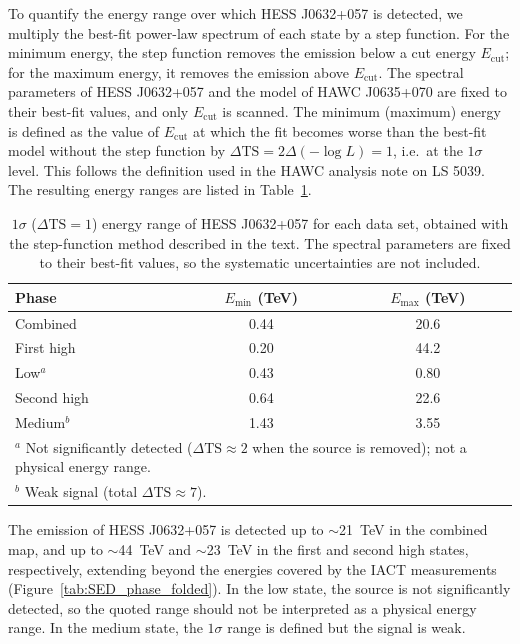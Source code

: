 \documentclass[10pt,letter]{article}
\begin{document}
To quantify the energy range over which HESS J0632+057 is detected, we multiply the best-fit power-law spectrum of each state by a step function. For the minimum energy, the step function removes the emission below a cut energy $E_{\mathrm{cut}}$; for the maximum energy, it removes the emission above $E_{\mathrm{cut}}$. The spectral parameters of HESS J0632+057 and the model of HAWC J0635+070 are fixed to their best-fit values, and only $E_{\mathrm{cut}}$ is scanned. The minimum (maximum) energy is defined as the value of $E_{\mathrm{cut}}$ at which the fit becomes worse than the best-fit model without the step function by $\Delta\mathrm{TS} = 2\Delta(-\log L) = 1$, i.e.\ at the $1\sigma$ level. This follows the definition used in the HAWC analysis note on LS 5039. The resulting energy ranges are listed in Table~\ref{tab:energy_range}.

\begin{table}[H]
\centering
\caption{$1\sigma$ ($\Delta\mathrm{TS} = 1$) energy range of HESS J0632+057 for each data set, obtained with the step-function method described in the text. The spectral parameters are fixed to their best-fit values, so the systematic uncertainties are not included.}
\label{tab:energy_range}
\renewcommand{\arraystretch}{1.2}
\begin{tabular}{l|c|c}
\hline
Phase & $E_{\mathrm{min}}$ (TeV) & $E_{\mathrm{max}}$ (TeV) \\
\hline
Combined    & 0.44 & 20.6 \\
\hline
First high  & 0.20 & 44.2 \\
Low$^{a}$   & 0.43 & 0.80 \\
Second high & 0.64 & 22.6 \\
Medium$^{b}$ & 1.43 & 3.55 \\
\hline
\multicolumn{3}{l}{\footnotesize $^{a}$ Not significantly detected ($\Delta\mathrm{TS} \approx 2$ when the source is removed); not a physical energy range.} \\
\multicolumn{3}{l}{\footnotesize $^{b}$ Weak signal (total $\Delta\mathrm{TS} \approx 7$).} \\
\end{tabular}
\end{table}

The emission of HESS J0632+057 is detected up to $\sim$21~TeV in the combined map, and up to $\sim$44~TeV and $\sim$23~TeV in the first and second high states, respectively, extending beyond the energies covered by the IACT measurements (Figure~\ref{tab:SED_phase_folded}). In the low state, the source is not significantly detected, so the quoted range should not be interpreted as a physical energy range. In the medium state, the $1\sigma$ range is defined but the signal is weak.

{}


\end{document}
